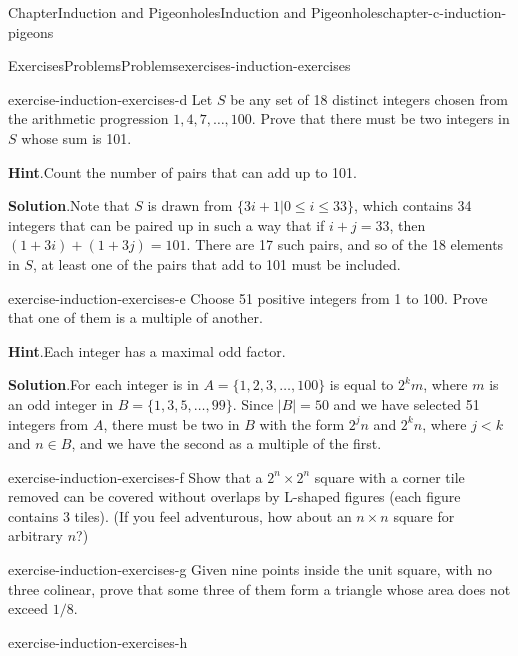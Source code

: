 \documentclass[oneside,10pt,]{book}
\newcommand{\blocktitlefont}{\relax}
\numberwithin{equation}{section}
\newcommand{\lt}{<}
\begin{document}
\begin{chapterptx}{Chapter}{Induction and Pigeonholes}{}{Induction and Pigeonholes}{}{}{chapter-c-induction-pigeons}
\begin{exercises-section}{Exercises}{Problems}{}{Problems}{}{}{exercises-induction-exercises}
\begin{divisionexercise}{3}{}{}{exercise-induction-exercises-d}
Let \(S\) be any set of 18 distinct integers chosen from the arithmetic progression \(1, 4, 7, \dots , 100\). Prove that there must be two integers in \(S\) whose sum is 101.%
\par\smallskip%
\noindent\textbf{\blocktitlefont Hint}.\hypertarget{hint-induction-exercises-d-b}{}\quad{}Count the number of pairs that can add up to 101.%
\par\smallskip%
\noindent\textbf{\blocktitlefont Solution}.\hypertarget{solution-induction-exercises-d-c}{}\quad{}Note that \(S\) is drawn from \(\{3i + 1 \vert 0 \leq i \leq 33 \}\), which contains 34 integers that can be paired up in such a way that if \(i + j = 33\), then  \((1+3i)+ (1+3j)=101\).  There are 17 such pairs, and so of the 18 elements in \(S\), at least one of the pairs that add to 101 must be included.%
\end{divisionexercise}%
\begin{divisionexercise}{4}{}{}{exercise-induction-exercises-e}%
Choose 51 positive integers from 1 to 100. Prove that one of them is a multiple of another.%
\par\smallskip%
\noindent\textbf{\blocktitlefont Hint}.\hypertarget{hint-induction-exercises-e-b}{}\quad{}Each integer has a maximal odd factor.%
\par\smallskip%
\noindent\textbf{\blocktitlefont Solution}.\hypertarget{solution-induction-exercises-e-c}{}\quad{}For each integer is in \(A = \{1, 2, 3, \dots, 100\}\) is equal to \(2^k m\), where \(m\) is an odd integer in \(B= \{1, 3, 5, \dots, 99\}\).  Since \(\lvert B \rvert =50\) and we have selected 51 integers from \(A\), there must be two in \(B\) with the form \(2^j n\) and \(2^k n\), where \(j \lt k\) and \(n \in B\), and we have the second as a multiple of the first.%
\end{divisionexercise}%
\begin{divisionexercise}{5}{}{}{exercise-induction-exercises-f}%
Show that a \(2^n \times  2^n\) square with a corner tile removed can be covered without overlaps by L-shaped figures (each figure contains 3 tiles). (If you feel adventurous, how about an \(n \times  n\) square for arbitrary \(n\)?)%
\end{divisionexercise}%
\begin{divisionexercise}{6}{}{}{exercise-induction-exercises-g}%
Given nine points inside the unit square, with no three colinear, prove that some three of them form a triangle whose area does not exceed \(1/8\).%
\end{divisionexercise}%
\begin{divisionexercise}{7}{}{}{exercise-induction-exercises-h}%

\end{divisionexercise}
\end{exercises-section}
\end{chapterptx}
\end{document}
